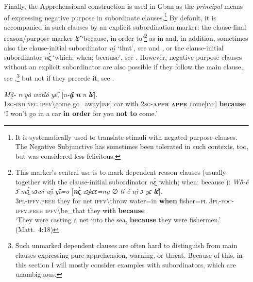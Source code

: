 \documentclass[output=paper,colorlinks,citecolor=brown
]{langscibook}
\begin{document}
Finally, the Apprehensional construction is used in Gban as the \textit{principal} means of expressing negative purpose in subordinate clauses.\footnote{It is systematically used to translate stimuli with negated purpose clauses. The Negative Subjunctive has sometimes been tolerated in such contexts, too, but was considered less felicitous.} By default, it is accompanied in such clauses by an explicit subordination marker: the clause-final reason\slash purpose marker \textit{lɛ̌} `because, in order to'\footnote{This marker's central use is to mark dependent reason clauses (usually together with the clause-initial subordinator \textit{nɛ̰̀} `which; when; because'):
\ea \label{ex:Fedfootnote22}
\gll \textit{Wȍ-é} \textit{ɔ̏} \textit{mɔ̰́} \textit{sɔwi} \textit{wı̰̋} \textit{yi̋=o} \textup{[}\textit{\textbf{nɛ̰̀}} \textit{zɔ̰kɛɛ=nṵ} ∅\textit{-lí-é} \textit{nı̰́} \textit{ɔ} \textit{yɛ} \textit{\textbf{lɛ̌}}\textup{]}\textit{.} \\
\textsc{3pl-ipfv.preh} they for net \textsc{ipfv}\backslash throw water=in \textbf{when} fisher=\textsc{pl} \textsc{3pl-foc-ipfv.preh} \textsc{ipfv}\backslash be\_that they with \textbf{because} \\
\glt `They were casting a net into the sea, \textbf{because} they were fishermen.' (Matt.\ 4:18)
\z} as in  and, in addition, sometimes also the clause-initial subordinator \textit{nı̰́} `that', see  and , or the clause-initial subordinator \textit{nɛ̰̀} `which; when; because', see . However, negative purpose clauses without an explicit subordinator are also possible if they follow the main clause, see ,\footnote{Such unmarked dependent clauses are often hard to distinguish from main clauses expressing pure apprehension, warning, or threat. Because of this, in this section I will mostly consider examples with subordinators, which are unambiguous.} but not if they precede it, see .

\ea \label{ex:Fed55}
\gll \textit{Mȁ̰-{\à}} \textit{n{\ù}} \textit{yà} \textit{wȍtló} \textit{yɛ̋,} \textup{[}\textit{n-\textbf{a̰̋}} \textit{\textbf{n{\ù}}} \textit{n{\ù}} \textit{\textbf{lɛ̌}}\textup{]}\textit{.}\\
\textsc{1sg-ind.neg} \textsc{ipfv\backslash}come go\_away[\textsc{inf}] car with \textsc{2sg-\textbf{appr}} \textsc{\textbf{appr}} come[\textsc{inf}] \textbf{because} \\
\glt `I won't go in a car \textbf{in order} for you \textbf{not to} come.'
\z
\end{document}

